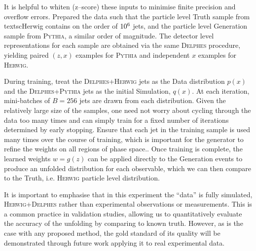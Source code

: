 {{            It is helpful to whiten (z--score) these inputs to minimise finite precision and overflow errors.
            Prepared the data such that the particle level Truth sample from textsc{Herwig} contains on the order of $\num{d6}$ jets, and the  particle level Generation sample from \textsc{Pythia}, a similar order of magnitude.
            The detector level representations for each sample are obtained via the same \textsc{Delphes} procedure, yielding paired $(z, x)$ examples for \textsc{Pythia} and independent $x$ examples for \textsc{Herwig}.
            
            During training, treat the \textsc{Delphes+Herwig} jets as the Data distribution $p(x)$ and the \textsc{Delphes+Pythia} jets as the initial Simulation, $q(x)$.
            At each iteration, mini-batches of $B=256$ jets are drawn from each distribution.
            Given the relatively large size of the samples, one need not worry about cycling through the data too many times and can simply train for a fixed number of iterations determined by early stopping.
            Ensure that each jet in the training sample is used many times over the course of training, which is important for the generator to refine the weights on all regions of phase space..
            Once training is complete, the learned weights $w = g(z)$ can be applied directly to the Generation events to produce an unfolded distribution for each observable, which we can then compare to the Truth, i.e. \textsc{Herwig} particle level distribution.
            
            It is important to emphasise that in this experiment the ``data'' is fully simulated, \textsc{Herwig+Delphes} rather than experimental observations or measurements.
            This is a common practice in validation studies, allowing us to quantitatively evaluate the accuracy of the unfolding by comparing to known truth.
            However, as is the case with any proposed method, the gold standard of its quality will be demonstrated through future work applying it to real experimental data.

}}
